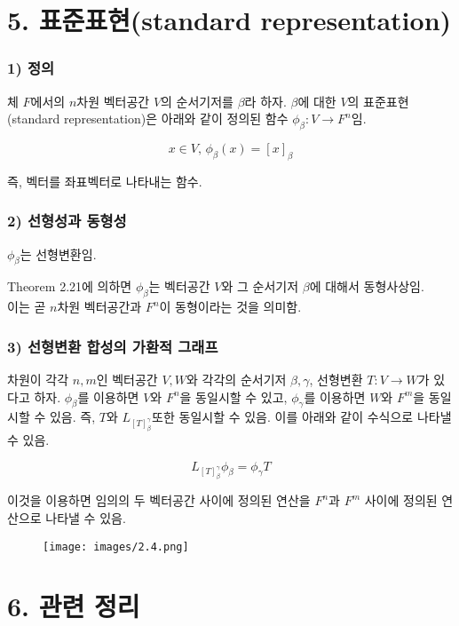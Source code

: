 \section*{5. 표준표현(standard representation)}
\subsubsection*{1) 정의\\}
\begin{DEF}
체 $F$에서의 $n$차원 벡터공간 $V$의 순서기저를 $\beta$라 하자. $\beta$에 대한 $V$의 표준표현(standard representation)은 아래와 같이 정의된 함수 $\phi_{\beta}:V \rightarrow F^n$임.

\[
x \in V,\,\phi_{\beta}(x)=[x]_{\beta}
\]
\end{DEF}

즉, 벡터를 좌표벡터로 나타내는 함수.

\subsubsection*{2) 선형성과 동형성}
$\phi_{\beta}$는 선형변환임.

Theorem 2.21에 의하면 $\phi_{\beta}$는 벡터공간 $V$와 그 순서기저 $\beta$에 대해서 동형사상임.\\
이는 곧 $n$차원 벡터공간과 $F^n$이 동형이라는 것을 의미함.


\newpage


\subsubsection*{3) 선형변환 합성의 가환적 그래프}
차원이 각각 $n,m$인 벡터공간 $V,W$와 각각의 순서기저 $\beta, \gamma$, 선형변환 $T:V \rightarrow W$가 있다고 하자. $\phi_{\beta}$를 이용하면 $V$와 $F^n$을 동일시할 수 있고, $\phi_{\gamma}$를 이용하면 $W$와 $F^m$을 동일시할 수 있음. 즉, $T$와 $L_{[T]_{\beta}^{\gamma}}$또한 동일시할 수 있음. 이를 아래와 같이 수식으로 나타낼 수 있음.

\[
L_{[T]_{\beta}^{\gamma}}\phi_{\beta}=\phi_{\gamma}T
\]

이것을 이용하면 임의의 두 벡터공간 사이에 정의된 연산을 $F^n$과 $F^m$ 사이에 정의된 연산으로 나타낼 수 있음.

\begin{figure}[hbt!]
    \centering
    \texttt{[image: images/2.4.png]}\\
\end{figure}

\section*{6. 관련 정리}
